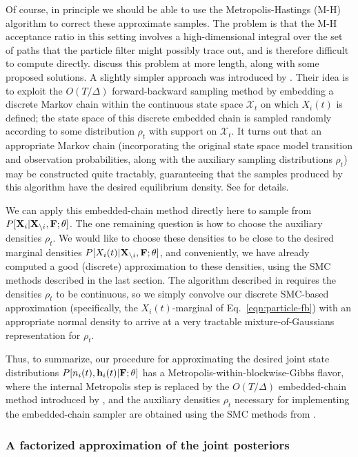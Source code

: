 \documentclass[aoas,preprint]{imsart}
\renewcommand{\i}{\backslash i}
\newcommand{\bth}{\mathbf{\theta}}
\newcommand{\bF}{{\bf F}}
\newcommand{\bX}{{\bf X}}
\newcommand{\bh}{\mathbf{h}}
\begin{document}
Of course, in principle we should be able to use the
Metropolis-Hastings (M-H) algorithm to correct these approximate
samples. The problem is that the M-H acceptance ratio in this setting
involves a high-dimensional integral over the set of paths that the
particle filter might possibly trace out, and is therefore difficult
to compute directly. \cite{Andrieu2007} discuss this problem at more
length, along with some proposed solutions. A slightly simpler
approach was introduced by \cite{NBR03}. Their idea is to exploit the
$O(T/\Delta)$ forward-backward sampling method by embedding a discrete
Markov chain within the continuous state space $\mathcal{X}_t$ on
which $X_i(t)$ is defined; the state space of this discrete embedded
chain is sampled randomly according to some distribution $\rho_t$ with
support on $\mathcal{X}_t$. It turns out that an appropriate Markov
chain (incorporating the original state space model transition and
observation probabilities, along with the auxiliary sampling
distributions $\rho_t$) may be constructed quite tractably,
guaranteeing that the samples produced by this algorithm have the
desired equilibrium density. See \cite{NBR03} for details.

We can apply this embedded-chain method directly here to sample from
$P[\bX_i | \bX_{\i}, \bF; \bth]$. The one remaining question is how to
choose the auxiliary densities $\rho_t$. We would like to choose these
densities to be close to the desired marginal densities $P[X_i(t) |
\bX_{\i}, \bF; \bth]$, and conveniently, we have already computed a
good (discrete) approximation to these densities, using the SMC
methods described in the last section. The algorithm described in
\cite{NBR03} requires the densities $\rho_t$ to be continuous, so we
simply convolve our discrete SMC-based approximation (specifically,
the $X_i(t)$-marginal of Eq.~\ref{eqn:particle-fb}) with an
appropriate normal density to arrive at a very tractable
mixture-of-Gaussians representation for $\rho_t$.

Thus, to summarize, our procedure for approximating the desired joint
state distributions $P[n_i(t), \bh_i(t) | \bF;\bth]$ has a
Metropolis-within-blockwise-Gibbs flavor, where the internal
Metropolis step is replaced by the $O(T/\Delta)$ embedded-chain method
introduced by \cite{NBR03}, and the auxiliary densities $\rho_t$
necessary for implementing the embedded-chain sampler are obtained
using the SMC methods from \cite{Vogelstein2009}.

\subsubsection{A factorized approximation of the joint posteriors}
\label{sec:cheaper-high-snr}
\end{document}
